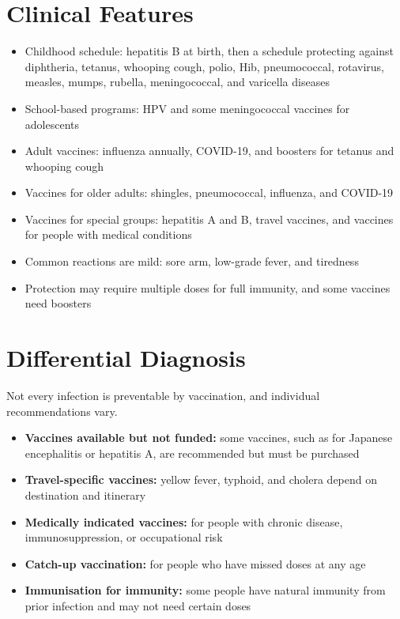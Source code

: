 \section*{Clinical Features}
\begin{itemize}
    \item Childhood schedule: hepatitis B at birth, then a schedule protecting against diphtheria, tetanus, whooping cough, polio, Hib, pneumococcal, rotavirus, measles, mumps, rubella, meningococcal, and varicella diseases
    \item School-based programs: HPV and some meningococcal vaccines for adolescents
    \item Adult vaccines: influenza annually, COVID-19, and boosters for tetanus and whooping cough
    \item Vaccines for older adults: shingles, pneumococcal, influenza, and COVID-19
    \item Vaccines for special groups: hepatitis A and B, travel vaccines, and vaccines for people with medical conditions
    \item Common reactions are mild: sore arm, low-grade fever, and tiredness
    \item Protection may require multiple doses for full immunity, and some vaccines need boosters
\end{itemize}

\section*{Differential Diagnosis}
Not every infection is preventable by vaccination, and individual recommendations vary.
\begin{itemize}
    \item \textbf{Vaccines available but not funded:} some vaccines, such as for Japanese encephalitis or hepatitis A, are recommended but must be purchased
    \item \textbf{Travel-specific vaccines:} yellow fever, typhoid, and cholera depend on destination and itinerary
    \item \textbf{Medically indicated vaccines:} for people with chronic disease, immunosuppression, or occupational risk
    \item \textbf{Catch-up vaccination:} for people who have missed doses at any age
    \item \textbf{Immunisation for immunity:} some people have natural immunity from prior infection and may not need certain doses
\end{itemize}


